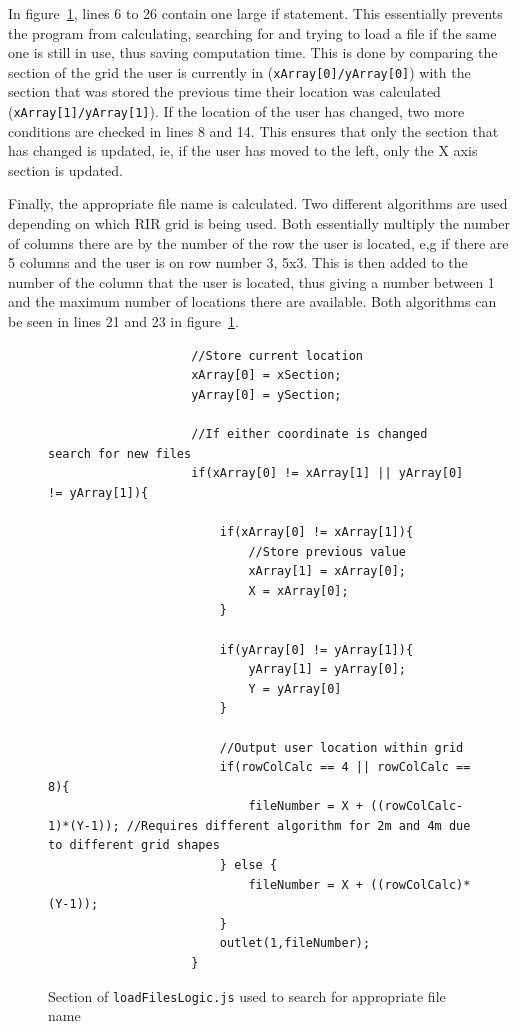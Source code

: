 \documentclass[../../main.tex]{subfiles}
\begin{document}

					In figure~\ref{jsFile}, lines 6 to 26 contain one large if statement. This essentially prevents the program from calculating, searching for and trying to load a file if the same one is still in use, thus saving computation time. This is done by comparing the section of the grid the user is currently in  (\texttt{xArray[0]/yArray[0]}) with the section that was stored the previous time their location was calculated  (\texttt{xArray[1]/yArray[1]}). If the location of the user has changed, two more conditions are checked in lines 8 and 14. This ensures that only the section that has changed is updated, ie, if the user has moved to the left, only the X axis section is updated.

					Finally, the appropriate file name is calculated. Two different algorithms are used depending on which \ac{RIR} grid is being used. Both essentially multiply the number of columns there are by the number of the row the user is located, e,g if there are 5 columns and the user is on row number 3, 5x3. This is then added to the number of the column that the user is located, thus giving a number between 1 and the maximum number of locations there are available. Both algorithms can be seen in lines 21 and 23 in figure~\ref{jsFile}.


				
					\begin{figure}[t]
					\begin{lstlisting}
					//Store current location
					xArray[0] = xSection;
					yArray[0] = ySection;

					//If either coordinate is changed search for new files
					if(xArray[0] != xArray[1] || yArray[0] != yArray[1]){
						
						if(xArray[0] != xArray[1]){
							//Store previous value
							xArray[1] = xArray[0];
							X = xArray[0];
						}
						
						if(yArray[0] != yArray[1]){
							yArray[1] = yArray[0];
							Y = yArray[0]
						}
						
						//Output user location within grid
						if(rowColCalc == 4 || rowColCalc == 8){
							fileNumber = X + ((rowColCalc-1)*(Y-1)); //Requires different algorithm for 2m and 4m due to different grid shapes
						} else {
							fileNumber = X + ((rowColCalc)*(Y-1));
						}	
						outlet(1,fileNumber);
					}
					\end{lstlisting}
					\caption{Section of \texttt{loadFilesLogic.js} used to search for appropriate file name}
					\label{jsFile}
					\end{figure}
		
\end{document}
